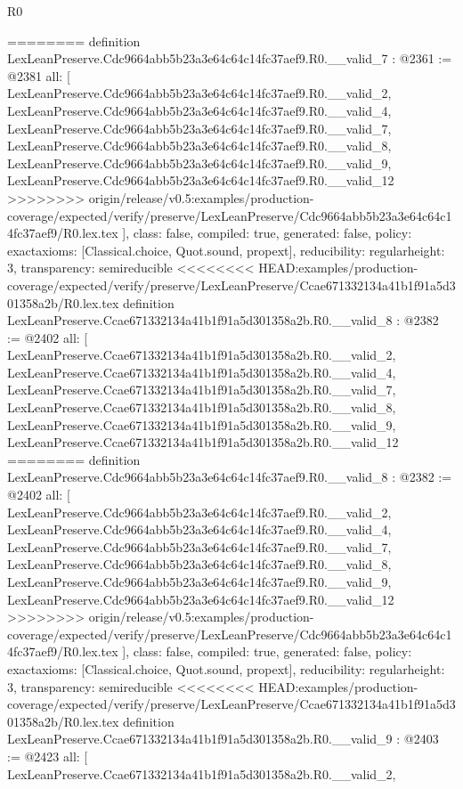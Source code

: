 \begin{lexlean}{R0}
\begin{coremodule}
{{{{{{{{{{{{{{{{{{{{{{{{{{{{{{{{{{{{{{{{{{{{{{========
definition LexLeanPreserve.Cdc9664abb5b23a3e64c64c14fc37aef9.R0.__valid_7 : @2361 := @2381 {
  all: [
    LexLeanPreserve.Cdc9664abb5b23a3e64c64c14fc37aef9.R0.__valid_2,
    LexLeanPreserve.Cdc9664abb5b23a3e64c64c14fc37aef9.R0.__valid_4,
    LexLeanPreserve.Cdc9664abb5b23a3e64c64c14fc37aef9.R0.__valid_7,
    LexLeanPreserve.Cdc9664abb5b23a3e64c64c14fc37aef9.R0.__valid_8,
    LexLeanPreserve.Cdc9664abb5b23a3e64c64c14fc37aef9.R0.__valid_9,
    LexLeanPreserve.Cdc9664abb5b23a3e64c64c14fc37aef9.R0.__valid_12
>>>>>>>> origin/release/v0.5:examples/production-coverage/expected/verify/preserve/LexLeanPreserve/Cdc9664abb5b23a3e64c64c14fc37aef9/R0.lex.tex
  ],
  class: false,
  compiled: true,
  generated: false,
  policy: exact{axioms: [Classical.choice, Quot.sound, propext]},
  reducibility: regular{height: 3},
  transparency: semireducible
}
<<<<<<<< HEAD:examples/production-coverage/expected/verify/preserve/LexLeanPreserve/Ccae671332134a41b1f91a5d301358a2b/R0.lex.tex
definition LexLeanPreserve.Ccae671332134a41b1f91a5d301358a2b.R0.__valid_8 : @2382 := @2402 {
  all: [
    LexLeanPreserve.Ccae671332134a41b1f91a5d301358a2b.R0.__valid_2,
    LexLeanPreserve.Ccae671332134a41b1f91a5d301358a2b.R0.__valid_4,
    LexLeanPreserve.Ccae671332134a41b1f91a5d301358a2b.R0.__valid_7,
    LexLeanPreserve.Ccae671332134a41b1f91a5d301358a2b.R0.__valid_8,
    LexLeanPreserve.Ccae671332134a41b1f91a5d301358a2b.R0.__valid_9,
    LexLeanPreserve.Ccae671332134a41b1f91a5d301358a2b.R0.__valid_12
========
definition LexLeanPreserve.Cdc9664abb5b23a3e64c64c14fc37aef9.R0.__valid_8 : @2382 := @2402 {
  all: [
    LexLeanPreserve.Cdc9664abb5b23a3e64c64c14fc37aef9.R0.__valid_2,
    LexLeanPreserve.Cdc9664abb5b23a3e64c64c14fc37aef9.R0.__valid_4,
    LexLeanPreserve.Cdc9664abb5b23a3e64c64c14fc37aef9.R0.__valid_7,
    LexLeanPreserve.Cdc9664abb5b23a3e64c64c14fc37aef9.R0.__valid_8,
    LexLeanPreserve.Cdc9664abb5b23a3e64c64c14fc37aef9.R0.__valid_9,
    LexLeanPreserve.Cdc9664abb5b23a3e64c64c14fc37aef9.R0.__valid_12
>>>>>>>> origin/release/v0.5:examples/production-coverage/expected/verify/preserve/LexLeanPreserve/Cdc9664abb5b23a3e64c64c14fc37aef9/R0.lex.tex
  ],
  class: false,
  compiled: true,
  generated: false,
  policy: exact{axioms: [Classical.choice, Quot.sound, propext]},
  reducibility: regular{height: 3},
  transparency: semireducible
}
<<<<<<<< HEAD:examples/production-coverage/expected/verify/preserve/LexLeanPreserve/Ccae671332134a41b1f91a5d301358a2b/R0.lex.tex
definition LexLeanPreserve.Ccae671332134a41b1f91a5d301358a2b.R0.__valid_9 : @2403 := @2423 {
  all: [
    LexLeanPreserve.Ccae671332134a41b1f91a5d301358a2b.R0.__valid_2,
}}}}}}}}}}}}}}}}}}}}}}}}}}}}}}}}}}}}}}}}}}}}}}}}
\end{coremodule}
\end{lexlean}
